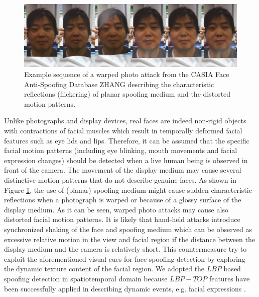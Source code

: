 \begin{figure}[!htb]
\begin{center}
\includegraphics [width=0.85\linewidth] {images/proposed_countermeasure/flicker.png}
\caption{Example sequence of a warped photo attack from the CASIA Face Anti-Spoofing Database ZHANG describing the characteristic reflections (flickering) of planar spoofing medium and the distorted motion patterns.} \label{fig:flickering}
\end{center}
\end{figure}

Unlike photographs and display devices, real faces are indeed non-rigid objects with contractions of facial muscles which result in temporally deformed facial features such as eye lids and lips. Therefore, it can be assumed that the specific facial motion patterns (including eye blinking, mouth movements and facial expression changes) should be detected when a live human being is observed in front of the camera. The movement of the display medium may cause several distinctive motion patterns that do not describe genuine faces. As shown in Figure \ref{fig:flickering}, the use of (planar) spoofing medium might cause sudden characteristic reflections when a photograph is warped or because of a glossy surface of the display medium. As it can be seen, warped photo attacks may cause also distorted facial motion patterns. It is likely that hand-held attacks introduce synchronized shaking of the face and spoofing medium which can be observed as excessive relative motion in the view and facial region if the distance between the display medium and the camera is relatively short. This countermeasure try to exploit the aforementioned visual cues for face spoofing detection by exploring the dynamic texture content of the facial region. We adopted the $LBP$ based spoofing detection in spatiotemporal domain because $LBP-TOP$ features have been successfully applied in describing dynamic events, e.g. facial expressions \cite{zhao2007dynamic}.


